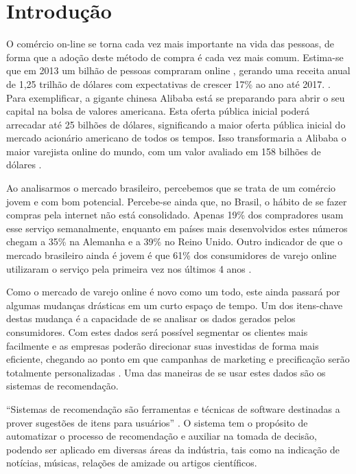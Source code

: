 \chapter[Introdução]{Introdução}
\label{chap:introducao}

O comércio on-line se torna cada vez mais importante na vida das pessoas, de forma que a adoção deste método de compra é cada vez mais comum. Estima-se que em 2013 um bilhão de pessoas compraram online \cite{emarketerB2CEcommerceClimbs}, gerando uma receita anual de 1,25 trilhão de dólares com expectativas de crescer 17\% ao ano até 2017. \cite{emarketerGlobalB2CSales}. Para exemplificar, a gigante chinesa Alibaba está se preparando para abrir o seu capital na bolsa de valores americana. Esta oferta pública inicial poderá arrecadar até 25 bilhões de dólares, significando a maior oferta pública inicial do mercado acionário americano de todos os tempos. Isso transformaria a Alibaba o maior varejista online do mundo, com um valor avaliado em 158 bilhões de dólares \cite{ForbesAlibabaBoostsIPO}.

Ao analisarmos o mercado brasileiro, percebemos que se trata de um comércio jovem e com bom potencial. Percebe-se ainda que, no Brasil, o hábito de se fazer compras pela internet não está consolidado. Apenas 19\% dos compradores usam esse serviço semanalmente, enquanto em países mais desenvolvidos estes números chegam a 35\% na Alemanha e a 39\% no Reino Unido. Outro indicador de que o mercado brasileiro ainda é jovem é que 61\% dos consumidores de varejo online utilizaram o serviço pela primeira vez nos últimos 4 anos \cite{PWCTotalRetail}.

Como o mercado de varejo online é novo como um todo, este ainda passará por algumas mudanças drásticas em um curto espaço de tempo. Um dos itens-chave destas mudança é a capacidade de se analisar os dados gerados pelos consumidores. Com estes dados será possível segmentar os clientes mais facilmente e as empresas poderão direcionar suas investidas de forma mais eficiente, chegando ao ponto em que campanhas de marketing e precificação serão totalmente personalizadas \cite{BCGThegotomarketrevolution}. Uma das maneiras de se usar estes dados são os sistemas de recomendação.

``Sistemas de recomendação são ferramentas e técnicas de software destinadas a prover sugestões de itens para usuários'' \cite{ricci2011introduction-chap1}. O sistema tem o propósito de automatizar o processo de recomendação e auxiliar na tomada de decisão, podendo ser aplicado em diversas áreas da indústria, tais como na indicação de notícias, músicas, relações de amizade ou artigos científicos.

